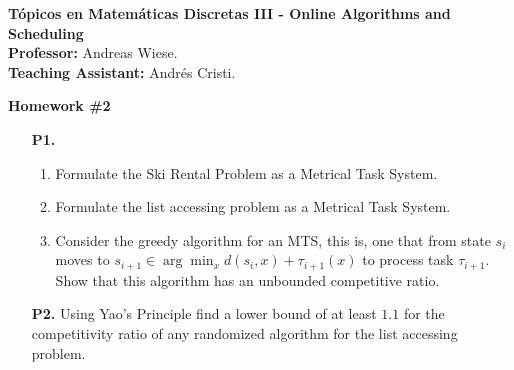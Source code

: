 \documentclass[11pt, spanish]{article}
\theoremstyle{plain}
\begin{document}

\begin{flushleft}
  \textbf{Tópicos en Matemáticas Discretas III - Online Algorithms and Scheduling}
  \\\textbf{Professor:} Andreas Wiese.
  \\\textbf{Teaching Assistant:} Andrés Cristi.
\end{flushleft}


\begin{center}
  \Large{\textbf{Homework \#2}}
\end{center}




\begin{itemize}
\item[\textbf{P1.}] 
  \begin{enumerate}
    \item Formulate the Ski Rental Problem as a Metrical Task System.
    \item Formulate the list accessing problem as a Metrical Task System.
    \item Consider the greedy algorithm for an MTS, this is, one that
      from state $s_i$ moves to $s_{i+1}\in \arg\min_x d(s_i,x) + \tau_{i+1}(x)$
      to process task $\tau_{i+1}$. Show that this algorithm has an
      unbounded competitive ratio.
  \end{enumerate}
  
  \item[\textbf{P2.}]  Using Yao's Principle find a lower bound of at least $1.1$ for
    the competitivity ratio of any randomized algorithm for the list 
    accessing problem.



\end{itemize}
\end{document}

